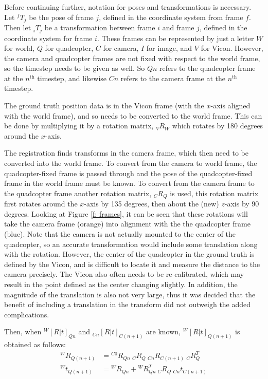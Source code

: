 \documentclass[12pt,a4paper]{article}
\begin{document}
    Before continuing further, notation for poses and transformations is necessary. Let ${}^fT_j$ be the pose of frame $j$, defined in the coordinate system from frame $f$. Then let ${}_iT_j$ be a transformation between frame $i$ and frame $j$, defined in the coordinate system for frame $i$. These frames can be represented by just a letter $W$ for world, $Q$ for quadcopter, $C$ for camera, $I$ for image, and $V$ for Vicon. However, the camera and quadcopter frames are not fixed with respect to the world frame, so the timestep needs to be given as well. So $Qn$ refers to the quadcopter frame at the $n^{\text{th}}$ timestep, and likewise $Cn$ refers to the camera frame at the $n^{\text{th}}$ timestep.
     
    The ground truth position data is in the Vicon frame (with the $x$-axis aligned with the world frame), and so needs to be converted to the world frame. This can be done by multiplying it by a rotation matrix, ${}_VR_W$ which rotates by 180 degrees around the $x$-axis.
     
    The registration finds transforms in the camera frame, which then need to be converted into the world frame. To convert from the camera to world frame, the quadcopter-fixed frame is passed through and the pose of the quadcopter-fixed frame in the world frame must be known. To convert from the camera frame to the quadcopter frame another rotation matrix, ${}_CR_Q$ is used, this rotation matrix first rotates around the $x$-axis by 135 degrees, then about the (new) $z$-axis by 90 degrees. Looking at Figure \ref{f: frames}, it can be seen that these rotations will take the camera frame (orange) into alignment with the the quadcopter frame (blue). Note that the camera is not actually mounted to the center of the quadcopter, so an accurate transformation would include some translation along with the rotation. However, the center of the quadcopter in the ground truth is defined by the Vicon, and is difficult to locate it and measure the distance to the camera precisely. The Vicon also often needs to be re-calibrated, which may result in the point defined as the center changing slightly. In addition, the magnitude of the translation is also not very large, thus it was decided that the benefit of including a translation in the transform did not outweigh the added complications.
     
    Then, when ${}^W[R|t]_{Qn}$ and ${}_{Cn}[R|t]_{C(n+1)}$ are known, ${}^W[R|t]_{Q(n+1)}$ is obtained as follows:
    \begin{align*}
    ^{W}R_{Q(n+1)} &= {}^{C0}R_{Qn} \: {}_CR_Q \: {}_{Cn}R_{C(n+1)} \: {}_CR_Q^T \\
    ^Wt_{Q(n+1)} &= {}^WR_{Qn} + {}^WR_{Qn}^T \: {}_CR_Q \: {}_{Cn} t_{C(n+1)} 
    \end{align*}
\end{document}
